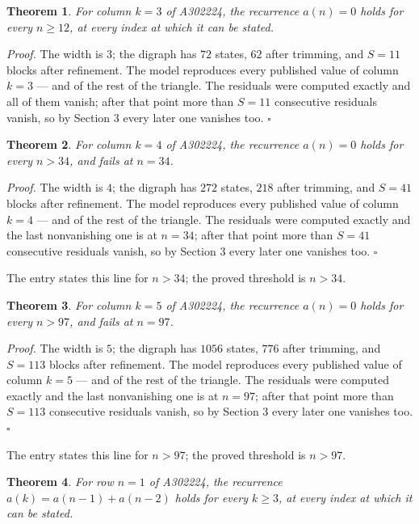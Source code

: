 \documentclass[11pt]{article}
\newtheorem{theorem}{Theorem}
\theoremstyle{definition}
\begin{document}
\begin{theorem} For column $k = 3$ of A302224, the recurrence $a(n) = 0$ holds for every $n \ge 12$, at every index at which it can be stated.\end{theorem}

{\itshape Proof.} The width is $3$; the digraph has $72$ states, $62$ after trimming, and $S = 11$ blocks after refinement. The model reproduces every published value of column $k = 3$ --- and of the rest of the triangle. The residuals were computed exactly and all of them vanish; after that point more than $S = 11$ consecutive residuals vanish, so by Section 3 every later one vanishes too. $\square$

\begin{theorem} For column $k = 4$ of A302224, the recurrence $a(n) = 0$ holds for every $n > 34$, and fails at $n = 34$.\end{theorem}

{\itshape Proof.} The width is $4$; the digraph has $272$ states, $218$ after trimming, and $S = 41$ blocks after refinement. The model reproduces every published value of column $k = 4$ --- and of the rest of the triangle. The residuals were computed exactly and the last nonvanishing one is at $n = 34$; after that point more than $S = 41$ consecutive residuals vanish, so by Section 3 every later one vanishes too. $\square$

The entry states this line for $n > 34$; the proved threshold is $n > 34$.

\begin{theorem} For column $k = 5$ of A302224, the recurrence $a(n) = 0$ holds for every $n > 97$, and fails at $n = 97$.\end{theorem}

{\itshape Proof.} The width is $5$; the digraph has $1056$ states, $776$ after trimming, and $S = 113$ blocks after refinement. The model reproduces every published value of column $k = 5$ --- and of the rest of the triangle. The residuals were computed exactly and the last nonvanishing one is at $n = 97$; after that point more than $S = 113$ consecutive residuals vanish, so by Section 3 every later one vanishes too. $\square$

The entry states this line for $n > 97$; the proved threshold is $n > 97$.

\begin{theorem} For row $n = 1$ of A302224, the recurrence $a(k) = a(n-1) + a(n-2)$ holds for every $k \ge 3$, at every index at which it can be stated.\end{theorem}
\end{document}

